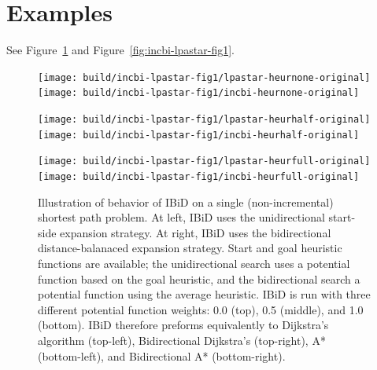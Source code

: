 \documentclass[nobib]{tufte-book}
\begin{document}
{\begin{algorithm}[t]
\begin{minipage}[t]{8.2cm}
   \end{minipage}
\end{algorithm}
} %

\section{Examples}

See Figure~\ref{fig:incbi-lpastar-fig1-heurchange}
and Figure~\ref{fig:incbi-lpastar-fig1}.

\begin{figure}
   \centering%
   
   \texttt{[image: build/incbi-lpastar-fig1/lpastar-heurnone-original]}%
   \;\;%
   \texttt{[image: build/incbi-lpastar-fig1/incbi-heurnone-original]}%
   
   \vspace{0.2cm}
   
   \texttt{[image: build/incbi-lpastar-fig1/lpastar-heurhalf-original]}%
   \;\;%
   \texttt{[image: build/incbi-lpastar-fig1/incbi-heurhalf-original]}%
   
   \vspace{0.2cm}
   
   \texttt{[image: build/incbi-lpastar-fig1/lpastar-heurfull-original]}%
   \;\;%
   \texttt{[image: build/incbi-lpastar-fig1/incbi-heurfull-original]}%
   
   \caption{Illustration of behavior of IBiD on a single
      (non-incremental) shortest path problem.
      At left, IBiD uses the unidirectional start-side expansion
      strategy.
      At right, IBiD uses the bidirectional distance-balanaced
      expansion strategy.
      Start and goal heuristic functions are available;
      the unidirectional search uses a potential function based
      on the goal heuristic,
      and the bidirectional search a potential function using
      the average heuristic.
      IBiD is run with three different potential function weights:
      0.0 (top), 0.5 (middle), and 1.0 (bottom).
      IBiD therefore preforms equivalently to
      Dijkstra's algorithm (top-left),
      Bidirectional Dijkstra's (top-right),
      A* (bottom-left),
      and Bidirectional A* (bottom-right).}
   \label{fig:incbi-lpastar-fig1-heurchange}
\end{figure}
\end{document}
